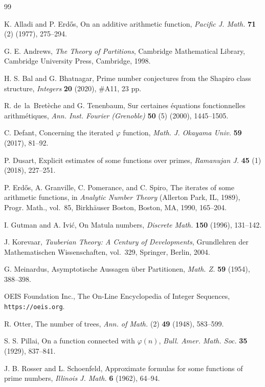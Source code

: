 \documentclass[11pt]{article}
\theoremstyle{definition}
\begin{document}
\begin{thebibliography}{99}

 K. Alladi and P. Erd\H{o}s, On an additive arithmetic function, {\it Pacific J. Math.} {\bf 71} (2) (1977), 275--294.

 G. E. Andrews, {\it The Theory of Partitions}, Cambridge Mathematical Library, Cambridge University Press, Cambridge, 1998.

 H. S. Bal and G. Bhatnagar, Prime number conjectures from the Shapiro class structure, {\it Integers} {\bf 20} (2020), \#A11, 23 pp.

 R. de~la~Bret\`eche and G. Tenenbaum, Sur certaines \'equations fonctionnelles arithm\'etiques, {\it Ann. Inst. Fourier (Grenoble)} {\bf 50} (5) (2000), 1445--1505.

 C. Defant, Concerning the iterated $\varphi$ function, {\it Math. J. Okayama Univ.} {\bf 59} (2017), 81--92.

 P. Dusart, Explicit estimates of some functions over primes, {\it Ramanujan J.} {\bf 45} (1) (2018), 227--251.

 P. Erd\H{o}s, A. Granville, C. Pomerance, and C. Spiro, The iterates of some arithmetic functions, in {\it Analytic Number Theory} (Allerton Park, IL, 1989), Progr. Math., vol.~85, Birkh\"auser Boston, Boston, MA, 1990, 165--204.

 I. Gutman and A. Ivi\'c, On Matula numbers, {\it Discrete Math.} {\bf 150} (1996), 131--142.

 J. Korevaar, {\it Tauberian Theory: A Century of Developments}, Grundlehren der Mathematischen Wissenschaften, vol.~329, Springer, Berlin, 2004.

 G. Meinardus, Asymptotische Aussagen \"uber Partitionen, {\it Math. Z.} {\bf 59} (1954), 388--398.

 OEIS Foundation Inc., The On-Line Encyclopedia of Integer Sequences, {\tt https://oeis.org}.

 R. Otter, The number of trees, {\it Ann. of Math.} (2) {\bf 49} (1948), 583--599.

 S. S. Pillai, On a function connected with $\varphi(n)$, {\it Bull. Amer. Math. Soc.} {\bf 35} (1929), 837--841.

 J. B. Rosser and L. Schoenfeld, Approximate formulas for some functions of prime numbers, {\it Illinois J. Math.} {\bf 6} (1962), 64--94.


\end{thebibliography}
\end{document}
